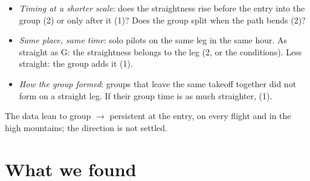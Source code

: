 \documentclass[10pt,a4paper]{article}
\newcommand{\G}{\mathrm{G}}
\newcommand{\Home}{\item[\textcolor{answer}{\textbf{Take home.}}]\color{black}}
\newenvironment{step}{\begin{description}[leftmargin=0pt, itemsep=7pt, topsep=8pt]}{\end{description}}
\begin{document}
\begin{step}
\begin{itemize}
  \item \emph{Timing at a shorter scale}: does the straightness rise before the entry into the group (2) or only
    after it (1)? Does the group split when the path bends (2)?
  \item \emph{Same place, same time}: solo pilots on the same leg in the same hour. As straight as $\G$: the
    straightness belongs to the leg (2, or the conditions). Less straight: the group adds it (1).
  \item \emph{How the group formed}: groups that leave the same takeoff together did not form on a straight
    leg. If their group time is as much straighter, (1).
  \end{itemize}
\Home The data lean to group $\to$ persistent at the entry, on every flight and in the high mountains; the direction
  is not settled.
\end{step}

\section{What we found}\label{ch:found}
\end{document}
